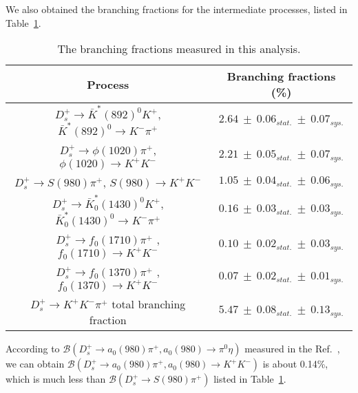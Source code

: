 \documentclass[aps,prd,twocolumn,showpacs,amsmath,amssymb]{revtex4-1}
\begin{document}
    We also obtained the branching fractions for the intermediate processes, listed in Table~\ref{total-BF}.
    \begin{table}[htbp]
        \caption{The branching fractions measured in this analysis.}
        \label{total-BF}
        \begin{center}
            \begin{tabular}{cc}
                \hline\hline
                Process & Branching fractions (\%)\\
                \hline
                $D_{s}^{+} \rightarrow \bar{K}^{*}(892)^{0}K^{+}$, $\bar{K}^{*}(892)^{0} \rightarrow K^{-}\pi^{+}$              & $2.64\ \pm\ 0.06_{stat.}\ \pm\ 0.07_{sys.}$  \\
                $D_{s}^{+} \rightarrow \phi(1020)\pi^{+}$, $\phi(1020) \rightarrow K^{+}K^{-}$                                  & $2.21\ \pm\ 0.05_{stat.}\ \pm\ 0.07_{sys.}$  \\
                $D_{s}^{+} \rightarrow S(980)\pi^{+}$, $S(980) \rightarrow K^{+}K^{-}$                                          & $1.05\ \pm\ 0.04_{stat.}\ \pm\ 0.06_{sys.}$  \\
                $D_{s}^{+} \rightarrow \bar{K}^{*}_{0}(1430)^{0}K^{+}$, $\bar{K}^{*}_{0}(1430)^{0} \rightarrow K^{-}\pi^{+}$    & $0.16\ \pm\ 0.03_{stat.}\ \pm\ 0.03_{sys.}$  \\
                $D_{s}^{+} \rightarrow f_{0}(1710)\pi^{+}$ ,$f_{0}(1710) \rightarrow K^{+}K^{-}$                                & $0.10\ \pm\ 0.02_{stat.}\ \pm\ 0.03_{sys.}$  \\
                $D_{s}^{+} \rightarrow f_{0}(1370)\pi^{+}$ ,$f_{0}(1370) \rightarrow K^{+}K^{-}$                                & $0.07\ \pm\ 0.02_{stat.}\ \pm\ 0.01_{sys.}$  \\
                $D_{s}^{+} \rightarrow K^{+}K^{-}\pi^{+}$ total branching fraction                                              & $5.47\ \pm\ 0.08_{stat.}\ \pm\ 0.13_{sys.}$ \\
                \hline\hline
            \end{tabular}
        \end{center}
    \end{table}
    According to $\mathcal{B}(D_{s}^{+} \rightarrow a_{0}(980)\pi^{+}, a_{0}(980) \rightarrow \pi^{0}\eta)$ measured in the Ref.~\cite{Doc-DB-682-v7}, we can obtain $\mathcal{B}(D_{s}^{+} \rightarrow a_{0}(980)\pi^{+}, a_{0}(980) \rightarrow K^{+}K^{-})$ is about 0.14\%, which is much less than $\mathcal{B}(D_{s}^{+} \rightarrow S(980)\pi^{+})$ listed in Table~\ref{total-BF}. 
\end{document}

